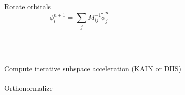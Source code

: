 \begin{frame}
{\begin{columns}
    \begin{column}[b]{0.4\textwidth}
    \centering
    Rotate orbitals
    \begin{equation}
	\nonumber
	\phi_i^{n+1} = \sum_jM^{-1}_{ij}\tilde{\phi}_j^n
    \end{equation}
    \end{column}
    \begin{column}[b]{0.1\textwidth}
    \ \\
    \end{column}
    \end{columns}
    \ \\
    \ \\
    \pause
    Compute iterative subspace acceleration (KAIN or DIIS)\\
    \ \\
    Orthonormalize\\
    \ \\
    }
\end{frame}


